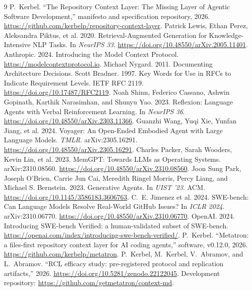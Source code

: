 \documentclass[sigconf,screen]{acmart}
\newcommand{\artifact}{\url{https://github.com/getmetatron/context-md}}
\newcommand{\artifactdoi}{\url{https://doi.org/10.5281/zenodo.22122045}}
\begin{document}
\begingroup\small\sloppy
\begin{thebibliography}{9}
 P.~Kerbel. ``The Repository Context Layer: The Missing Layer
of Agentic Software Development,'' manifesto and specification repository, 2026.
\url{https://github.com/kerbelp/repository-context-layer}.
 Patrick Lewis, Ethan Perez, Aleksandra Piktus, et al. 2020.
Retrieval-Augmented Generation for Knowledge-Intensive NLP Tasks. In \emph{NeurIPS
33}. \url{https://doi.org/10.48550/arXiv.2005.11401}.
 Anthropic. 2024. Introducing the Model Context Protocol.
\url{https://modelcontextprotocol.io}.
 Michael Nygard. 2011. Documenting Architecture Decisions.
 Scott Bradner. 1997. Key Words for Use in RFCs to Indicate
Requirement Levels. IETF RFC 2119. \url{https://doi.org/10.17487/RFC2119}.
 Noah Shinn, Federico Cassano, Ashwin Gopinath,
Karthik Narasimhan, and Shunyu Yao. 2023. Reflexion: Language Agents with Verbal
Reinforcement Learning. In \emph{NeurIPS 36}.
\url{https://doi.org/10.48550/arXiv.2303.11366}.
 Guanzhi Wang, Yuqi Xie, Yunfan Jiang, et al. 2024.
Voyager: An Open-Ended Embodied Agent with Large Language Models. \emph{TMLR}.
arXiv:2305.16291. \url{https://doi.org/10.48550/arXiv.2305.16291}.
 Charles Packer, Sarah Wooders, Kevin Lin, et al. 2023.
MemGPT: Towards LLMs as Operating Systems. arXiv:2310.08560.
\url{https://doi.org/10.48550/arXiv.2310.08560}.
 Joon Sung Park, Joseph O'Brien, Carrie Jun Cai,
Meredith Ringel Morris, Percy Liang, and Michael S. Bernstein. 2023. Generative
Agents. In \emph{UIST '23}. ACM. \url{https://doi.org/10.1145/3586183.3606763}.
 C.~E. Jimenez et al. 2024. SWE-bench: Can Language Models
Resolve Real-World GitHub Issues? In \emph{ICLR 2024}. arXiv:2310.06770.
\url{https://doi.org/10.48550/arXiv.2310.06770}.
 OpenAI. 2024. Introducing SWE-bench Verified: a
human-validated subset of SWE-bench.
\url{https://openai.com/index/introducing-swe-bench-verified/}.
 P.~Kerbel. ``Metatron: a files-first repository context layer
for AI coding agents,'' software, v0.12.0, 2026.
\url{https://github.com/kerbelp/metatron}.
 P.~Kerbel, M.~Kerbel, V.~Abramov, and L.~Abramov. ``RCL
efficacy study: pre-registered protocol and replication artifacts,'' 2026.
\artifactdoi{}. Development repository: \artifact.
\end{thebibliography}
\endgroup
\end{document}
